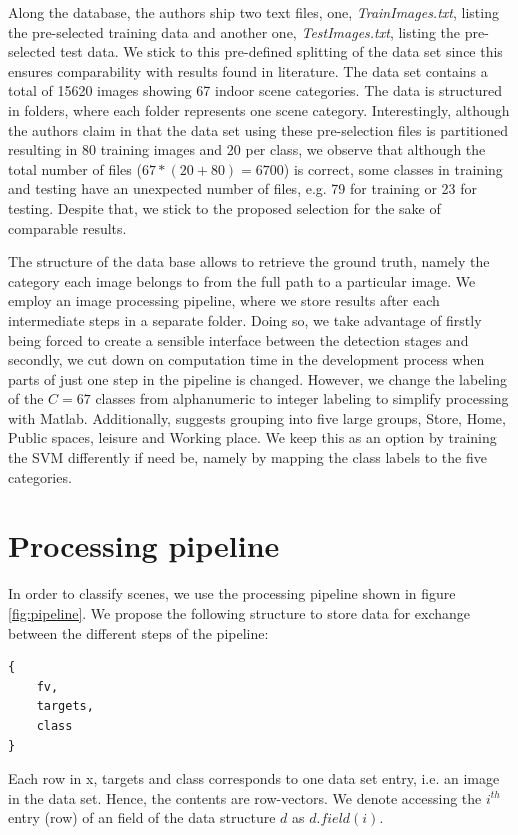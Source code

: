 \documentclass[10pt,twocolumn,letterpaper]{article}
\begin{document}
Along the database, the authors ship two text files, one, \emph{TrainImages.txt}, listing the pre-selected training data and another one, \emph{TestImages.txt}, listing the pre-selected test data. We stick to this pre-defined splitting of the data set since this ensures comparability with results found in literature. The data set contains a total of 15620 images showing 67 indoor scene categories. The data is structured in folders, where each folder represents one scene category. Interestingly, although the authors claim in \cite{indoorScenes} that the data set using these pre-selection files is partitioned resulting in 80 training images and 20 per class, we observe that although the total number of files ($67*(20+80) = 6700$) is correct, some classes in training and testing have an unexpected number of files, e.g. 79 for training or 23 for testing. Despite that, we stick to the proposed selection for the sake of comparable results.

The structure of the data base allows to retrieve the ground truth, namely the category each image belongs to from the full path to a particular image. We employ an image processing pipeline, where we store results after each intermediate steps in a separate folder. Doing so, we take advantage of firstly being forced to create a sensible interface between the detection stages and secondly, we cut down on computation time in the development process when parts of just one step in the pipeline is changed. However, we change the labeling of the $C=67$ classes from alphanumeric to integer labeling to simplify processing with Matlab. Additionally, \cite{indoorScenes} suggests grouping into five large groups, Store, Home, Public spaces, leisure and Working place. We keep this as an option by training the SVM differently if need be, namely by mapping the class labels to the five categories.



\section{Processing pipeline}
In order to classify scenes, we use the processing pipeline shown in figure \ref{fig:pipeline}. We propose the following structure to store data for exchange between the different steps of the pipeline:


\begin{lstlisting}
{
	fv,
	targets,
	class
}
\end{lstlisting}

Each row in x, targets and class corresponds to one data set entry, i.e. an image in the data set. Hence, the contents are row-vectors. We denote accessing the $i^{th}$ entry (row) of an field of the data structure $d$ as $d.field(i)$. 
\end{document}
